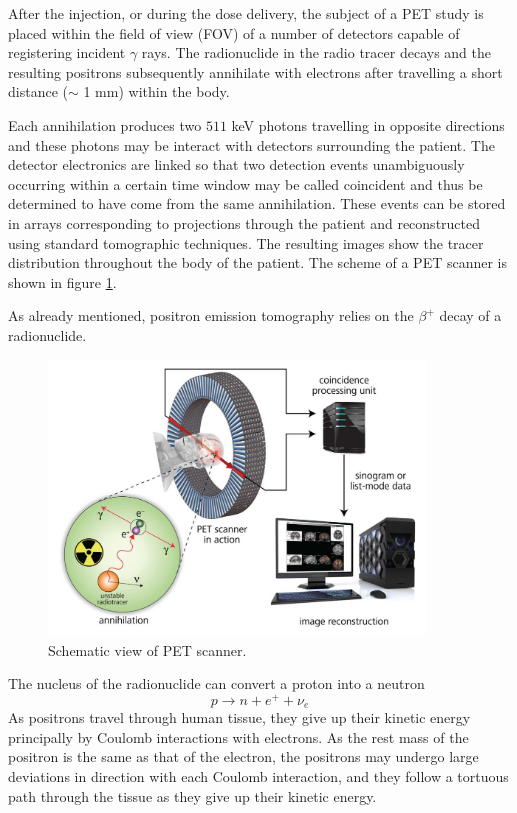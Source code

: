 After the injection, or during the dose delivery, the subject of a PET study is placed within the field of view (FOV) of a number of detectors capable of registering incident $\gamma$ rays. The radionuclide in the radio tracer decays and the resulting positrons subsequently annihilate with electrons after travelling a short distance ($\sim$ 1 mm) within the body.

Each annihilation produces two $511$ keV photons travelling in opposite directions and these photons may be interact with detectors surrounding the patient. The detector electronics are linked so that two detection events unambiguously occurring within a certain time window may be called coincident and thus be determined to have come from the same annihilation. These events can be stored in arrays corresponding to projections through the patient and reconstructed using standard tomographic techniques. The resulting images show the tracer distribution throughout the body of the patient. The scheme of a PET scanner is shown in figure \ref{fig:PET}.

As already mentioned, positron emission tomography relies on the $\beta ^{+}$ decay of a radionuclide.
\begin{figure}
\centering  
\includegraphics[width=10cm]{Pictures/Chapter_1/PET_scheme}
\caption[PET scanner]{Schematic view of PET scanner.}
\label{fig:PET}
\end{figure}
The nucleus of the radionuclide can convert a proton into a neutron 
\begin{displaymath}
p\rightarrow n + e^{+} + \nu _{e}
\end{displaymath}
As positrons travel through human tissue, they give up their kinetic energy principally by Coulomb interactions with electrons. As the rest mass of the positron is the same as that of the electron, the positrons may undergo large deviations in direction with each Coulomb interaction, and they follow a tortuous path through the tissue as they give up their kinetic energy.

